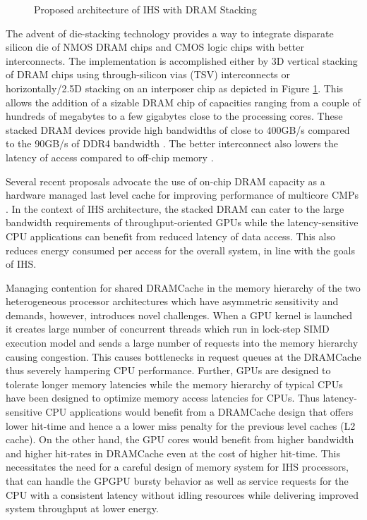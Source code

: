 \begin{figure}[!htb]
	\centering
	\def\svgwidth{0.7\columnwidth}
	
	\caption{Proposed architecture of IHS with DRAM Stacking}
	\label{fig:stackdram}
\end{figure}
\par The advent of die-stacking technology \cite{3d-stacking} provides a way to integrate disparate silicon die of NMOS DRAM chips and CMOS logic chips with better interconnects. The implementation is accomplished either by 3D vertical stacking of DRAM chips using through-silicon vias (TSV) interconnects or horizontally/2.5D stacking on an interposer chip as depicted in Figure \ref{fig:stackdram}. This allows the addition of a sizable DRAM chip of capacities ranging from a couple of hundreds of megabytes to a few gigabytes close to the processing cores. These stacked DRAM devices provide high bandwidths of close to 400GB/s compared to the 90GB/s of DDR4 bandwidth \cite{xeonphi}. The better interconnect also lowers the latency of access compared to off-chip memory \cite{alloy}. 
\par Several recent proposals advocate the use of on-chip DRAM capacity as a hardware managed last level cache for improving performance of multicore CMPs \cite{alloy,bimodal,loh-hill,atcache}. In the context of IHS architecture, the stacked DRAM can cater to the large bandwidth requirements of throughput-oriented GPUs while the latency-sensitive CPU applications can benefit from reduced latency of data access. 
This also reduces energy consumed per access for the overall system, in line with the goals of IHS.
\par Managing contention for shared DRAMCache in the memory hierarchy of the two heterogeneous processor architectures which have asymmetric sensitivity and demands, however, introduces novel challenges. When a GPU kernel is launched it creates large number of concurrent threads which run in lock-step SIMD execution model and sends a large number of requests into the memory hierarchy causing congestion. This causes bottlenecks in request queues at the DRAMCache thus severely hampering CPU performance. Further, GPUs are designed to tolerate longer memory latencies while the memory hierarchy of typical CPUs have been designed to optimize memory access latencies for CPUs. 
Thus latency-sensitive CPU applications would benefit from a DRAMCache design that offers lower hit-time and hence a a lower miss penalty for the previous level caches (L2 cache). On the other hand, the GPU cores would benefit from higher bandwidth and higher hit-rates in DRAMCache even at the cost of higher hit-time. This necessitates the need for a careful design of memory system for IHS processors, that can handle the GPGPU bursty behavior as well as service requests for the CPU with a consistent latency without idling resources while delivering improved system throughput at lower energy.